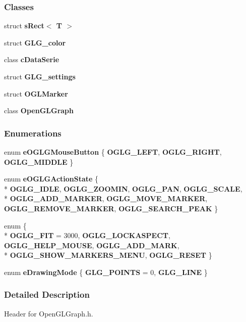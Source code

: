 \subsubsection*{Classes}
\begin{DoxyCompactItemize}
\item 
struct {\bf s\+Rect$<$ T $>$}
\item 
struct {\bf G\+L\+G\+\_\+color}
\item 
class {\bf c\+Data\+Serie}
\item 
struct {\bf G\+L\+G\+\_\+settings}
\item 
struct {\bf O\+G\+L\+Marker}
\item 
class {\bf Open\+G\+L\+Graph}
\end{DoxyCompactItemize}
\subsubsection*{Enumerations}
\begin{DoxyCompactItemize}
\item 
enum {\bf e\+O\+G\+L\+G\+Mouse\+Button} \{ {\bf O\+G\+L\+G\+\_\+\+L\+E\+FT}, 
{\bf O\+G\+L\+G\+\_\+\+R\+I\+G\+HT}, 
{\bf O\+G\+L\+G\+\_\+\+M\+I\+D\+D\+LE}
 \}
\item 
enum {\bf e\+O\+G\+L\+G\+Action\+State} \{ \\*
{\bf O\+G\+L\+G\+\_\+\+I\+D\+LE}, 
{\bf O\+G\+L\+G\+\_\+\+Z\+O\+O\+M\+IN}, 
{\bf O\+G\+L\+G\+\_\+\+P\+AN}, 
{\bf O\+G\+L\+G\+\_\+\+S\+C\+A\+LE}, 
\\*
{\bf O\+G\+L\+G\+\_\+\+A\+D\+D\+\_\+\+M\+A\+R\+K\+ER}, 
{\bf O\+G\+L\+G\+\_\+\+M\+O\+V\+E\+\_\+\+M\+A\+R\+K\+ER}, 
{\bf O\+G\+L\+G\+\_\+\+R\+E\+M\+O\+V\+E\+\_\+\+M\+A\+R\+K\+ER}, 
{\bf O\+G\+L\+G\+\_\+\+S\+E\+A\+R\+C\+H\+\_\+\+P\+E\+AK}
 \}
\item 
enum \{ \\*
{\bf O\+G\+L\+G\+\_\+\+F\+IT} = 3000, 
{\bf O\+G\+L\+G\+\_\+\+L\+O\+C\+K\+A\+S\+P\+E\+CT}, 
{\bf O\+G\+L\+G\+\_\+\+H\+E\+L\+P\+\_\+\+M\+O\+U\+SE}, 
{\bf O\+G\+L\+G\+\_\+\+A\+D\+D\+\_\+\+M\+A\+RK}, 
\\*
{\bf O\+G\+L\+G\+\_\+\+S\+H\+O\+W\+\_\+\+M\+A\+R\+K\+E\+R\+S\+\_\+\+M\+E\+NU}, 
{\bf O\+G\+L\+G\+\_\+\+R\+E\+S\+ET}
 \}
\item 
enum {\bf e\+Drawing\+Mode} \{ {\bf G\+L\+G\+\_\+\+P\+O\+I\+N\+TS} = 0, 
{\bf G\+L\+G\+\_\+\+L\+I\+NE}
 \}
\end{DoxyCompactItemize}


\subsubsection{Detailed Description}
Header for Open\+G\+L\+Graph.\+h. 

